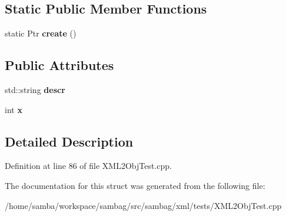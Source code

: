 \subsection*{Static Public Member Functions}
\begin{DoxyCompactItemize}
\item 
\hypertarget{struct_object_b_a3f9d1754512a4336dcb6b12eb92c646a}{
static Ptr {\bfseries create} ()}
\label{struct_object_b_a3f9d1754512a4336dcb6b12eb92c646a}

\end{DoxyCompactItemize}
\subsection*{Public Attributes}
\begin{DoxyCompactItemize}
\item 
\hypertarget{struct_object_b_a1e6125e5a6a68ece3bb3892b4112f8bc}{
std::string {\bfseries descr}}
\label{struct_object_b_a1e6125e5a6a68ece3bb3892b4112f8bc}

\item 
\hypertarget{struct_object_b_a87defdb7fc7f6a61a02a5ba0cae1fe21}{
int {\bfseries x}}
\label{struct_object_b_a87defdb7fc7f6a61a02a5ba0cae1fe21}

\end{DoxyCompactItemize}


\subsection{Detailed Description}


Definition at line 86 of file XML2ObjTest.cpp.



The documentation for this struct was generated from the following file:\begin{DoxyCompactItemize}
\item 
/home/samba/workspace/sambag/src/sambag/xml/tests/XML2ObjTest.cpp\end{DoxyCompactItemize}

